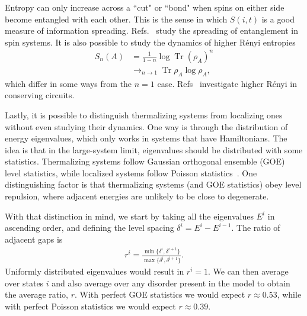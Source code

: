 \documentclass[a4paper,11pt]{article}
\renewcommand{\th}[1]{\frac{1}{#1}}
\newcommand{\nn}{\nonumber\\}
\DeclareMathOperator{\Tr}{Tr}
\begin{document}
Entropy can only increase across a ``cut" or ``bond" when spins on either side become entangled with each other. This is the sense in which $S(i,t)$ is a good measure of information spreading. Refs.~\cite{BardarsonPollmannMoore, NahumEntanglement, NahumRuhmanHuse, JonayEntanglement} study the spreading of entanglement in spin systems. It is also possible to study the dynamics of higher R\'{e}nyi entropies 
\begin{align}
S_n(A) &= \th{1-n}\log\Tr(\rho_A)^n\nn
&\rightarrow_{n\to 1}\Tr\rho_A\log\rho_A,
\end{align}
which differ in some ways from the $n=1$ case. Refs~\cite{RakovskyDiff, HuangRenyi} investigate higher R\'{e}nyi in conserving circuits. 

Lastly, it is possible to distinguish thermalizing systems from localizing ones without even studying their dynamics. One way is through the distribution of energy eigenvalues, which only works in systems that have Hamiltonians. The idea is that in the large-system limit, eigenvalues should be distributed with some statistics. Thermalizing systems follow Gaussian orthogonal ensemble (GOE) level statistics, while localized systems follow Poisson statistics~\cite{OganesyanHuse}. One distinguishing factor is that thermalizing systems (and GOE statistics) obey level repulsion, where adjacent energies are unlikely to be close to degenerate.

With that distinction in mind, we start by taking all the eigenvalues $E^i$ in ascending order, and defining the level spacing $\delta^i = E^i-E^{i-1}$. The ratio of adjacent gaps is~\cite{OganesyanHuse}
\begin{align}
r^i = \frac{\min\{\delta^i, \delta^{i+1}\}}{\max\{\delta^i, \delta^{i+1}\}}.
\end{align}
Uniformly distributed eigenvalues would result in $r^i=1$. We can then average over states $i$ and also average over any disorder present in the model to obtain the average ratio, $r$. With perfect GOE statistics we would expect $r\approx0.53$, while with perfect Poisson statistics we would expect $r\approx0.39$.
\end{document}
